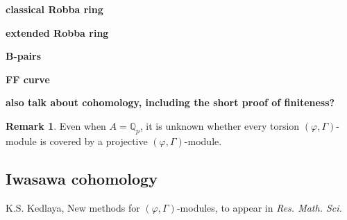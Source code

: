 \documentclass[12pt]{amsart}
\theoremstyle{definition}
\newtheorem{remark}[theorem]{Remark}
\numberwithin{equation}{theorem}
\newcommand{\QQ}{\mathbb{Q}}
\begin{document}
\textbf{classical Robba ring}

\textbf{extended Robba ring}

\textbf{B-pairs}

\textbf{FF curve}

\textbf{also talk about cohomology, including the short proof of finiteness?}

\begin{remark}
Even when $A = \QQ_p$, it is unknown whether every torsion $(\varphi, \Gamma)$-module is covered by a projective $(\varphi, \Gamma)$-module.
\end{remark}

\subsection{Iwasawa cohomology}

\begin{thebibliography}{99}

K.S. Kedlaya, New methods for $(\varphi, \Gamma)$-modules,
to appear in \textit{Res. Math. Sci.}

\end{thebibliography}
\end{document}
